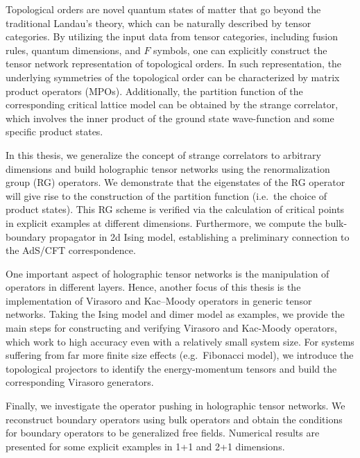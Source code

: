 \begin{abstract*}

Topological orders are novel quantum states of matter that go beyond the traditional Landau's theory, which can be naturally described by tensor categories. By utilizing the input data from tensor categories, including fusion rules, quantum dimensions, and $F$ symbols, one can explicitly construct the tensor network representation of topological orders. In such representation, the underlying symmetries of the topological order can be characterized by matrix product operators (MPOs). Additionally, the partition function of the corresponding critical lattice model can be obtained by the strange correlator, which involves the inner product of the ground state wave-function and some specific product states.

In this thesis, we generalize the concept of strange correlators to arbitrary dimensions and build holographic tensor networks using the renormalization group (RG) operators. We demonstrate that the eigenstates of the RG operator will give rise to the construction of the partition function (i.e.\ the choice of product states). This RG scheme is verified via the calculation of critical points in explicit examples at different dimensions. Furthermore, we compute the bulk-boundary propagator in 2d Ising model, establishing a preliminary connection to the AdS/CFT correspondence.

One important aspect of holographic tensor networks is the manipulation of operators in different layers. Hence, another focus of this thesis is the implementation of Virasoro and Kac--Moody operators in generic tensor networks. Taking the Ising model and dimer model as examples, we provide the main steps for constructing and verifying Virasoro and Kac-Moody operators, which work to high accuracy even with a relatively small system size. For systems suffering from far more finite size effects (e.g.\ Fibonacci model), we introduce the topological projectors to identify the energy-momentum tensors and build the corresponding Virasoro generators.

Finally, we investigate the operator pushing in holographic tensor networks. We reconstruct boundary operators using bulk operators and obtain the conditions for boundary operators to be generalized free fields. Numerical results are presented for some explicit examples in 1+1 and 2+1 dimensions.

\end{abstract*}
